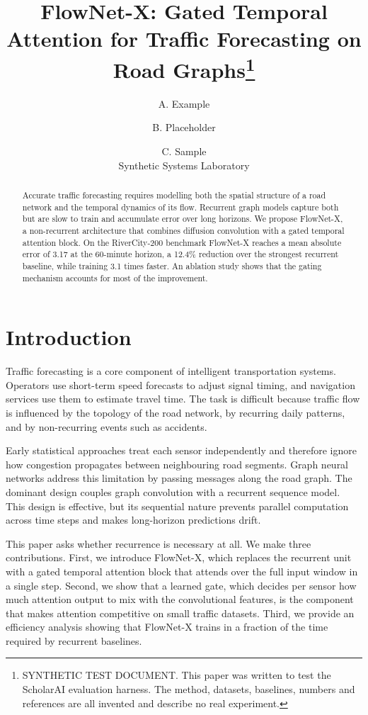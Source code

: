 \documentclass[10pt,twocolumn]{article}
\title{FlowNet-X: Gated Temporal Attention for Traffic Forecasting on Road Graphs\thanks{SYNTHETIC TEST DOCUMENT. This paper was written to test the ScholarAI evaluation harness. The method, datasets, baselines, numbers and references are all invented and describe no real experiment.}}
\author{A. Example \and B. Placeholder \and C. Sample\\ \small Synthetic Systems Laboratory}
\date{}
\begin{document}
\maketitle

\begin{abstract}
Accurate traffic forecasting requires modelling both the spatial structure of a road network and the temporal dynamics of its flow. Recurrent graph models capture both but are slow to train and accumulate error over long horizons. We propose FlowNet-X, a non-recurrent architecture that combines diffusion convolution with a gated temporal attention block. On the RiverCity-200 benchmark FlowNet-X reaches a mean absolute error of 3.17 at the 60-minute horizon, a 12.4\% reduction over the strongest recurrent baseline, while training 3.1 times faster. An ablation study shows that the gating mechanism accounts for most of the improvement.
\end{abstract}

\section{Introduction}
Traffic forecasting is a core component of intelligent transportation systems. Operators use short-term speed forecasts to adjust signal timing, and navigation services use them to estimate travel time. The task is difficult because traffic flow is influenced by the topology of the road network, by recurring daily patterns, and by non-recurring events such as accidents.

Early statistical approaches treat each sensor independently and therefore ignore how congestion propagates between neighbouring road segments. Graph neural networks address this limitation by passing messages along the road graph. The dominant design couples graph convolution with a recurrent sequence model. This design is effective, but its sequential nature prevents parallel computation across time steps and makes long-horizon predictions drift.

This paper asks whether recurrence is necessary at all. We make three contributions. First, we introduce FlowNet-X, which replaces the recurrent unit with a gated temporal attention block that attends over the full input window in a single step. Second, we show that a learned gate, which decides per sensor how much attention output to mix with the convolutional features, is the component that makes attention competitive on small traffic datasets. Third, we provide an efficiency analysis showing that FlowNet-X trains in a fraction of the time required by recurrent baselines.
\end{document}
